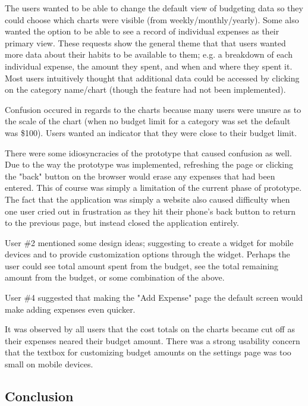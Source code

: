 \documentclass{chi2011}
\begin{document}
    The users wanted to be able to change the default view of budgeting data so
    they could choose which charts were visible (from weekly/monthly/yearly).
    Some also wanted the option to be able to see a record of individual
    expenses as their primary view. These requests show the general theme
    that that users wanted more data about their habits to be available to
    them; e.g. a breakdown of each individual expense, the amount they spent,
    and when and where they spent it. Most users intuitively thought that
    additional data could be accessed by clicking on the category name/chart (though the feature had not been
    implemented).

    Confusion occured in regards to the charts because many users were unsure
    as to the scale of the chart (when no budget limit for a category was set
    the default was \$100). Users wanted an indicator that they were 
    close to their budget limit. 

    There were some idiosyncracies of the prototype that caused confusion as
    well. Due to the way the prototype was implemented, refreshing the page or
    clicking the "back" button on the browser would erase any expenses that
    had been entered. This of course was simply a limitation of the current
    phase of prototype. The fact that the application was simply a website also
    caused difficulty when one user cried out in frustration as they hit their
    phone's back button to return to the previous page, but instead closed the
    application entirely.
        
    User \#2 mentioned some design ideas; suggesting to create a widget for mobile
    devices and to provide customization options through the widget. Perhaps the
    user could see total amount spent from the budget, see the total remaining
    amount from the budget, or some combination of the above.
        
    User \#4 suggested that making the "Add Expense" page the default screen would
    make adding expenses even quicker.
        
    It was observed by all users that the cost totals on the charts became
    cut off as their expenses neared their budget amount. There was a strong
    usability concern that the textbox for customizing budget amounts on the
    settings page was too small on mobile devices.

	\subsection{Conclusion}
\end{document}
